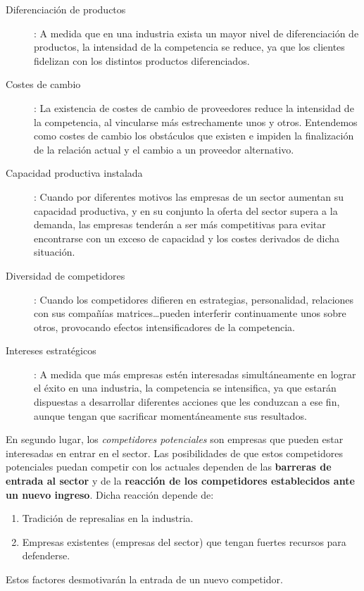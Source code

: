 \documentclass[10pt,a4paper,spanish]{report}
\begin{document}
\begin{description}
\begin{center}
                  \end{center}
                  \item[Diferenciación de productos]: A medida que en una industria exista un mayor nivel de diferenciación de productos, la intensidad de la competencia se reduce, ya que los clientes fidelizan con los distintos productos diferenciados.
                  \item[Costes de cambio]: La existencia de costes de cambio de proveedores reduce la intensidad de la competencia, al vincularse más estrechamente unos y otros. Entendemos como costes de cambio los obstáculos que existen e impiden la finalización de la relación actual y el cambio a un proveedor alternativo.
                  \item[Capacidad productiva instalada]: Cuando por diferentes motivos las empresas de un sector aumentan su capacidad productiva, y en su conjunto la oferta del sector supera a la demanda, las empresas tenderán a ser más competitivas para evitar encontrarse con un exceso de capacidad y los costes derivados de dicha situación.
                  \item[Diversidad de competidores]: Cuando los competidores difieren en estrategias, personalidad, relaciones con sus compañías matrices\ldots pueden interferir continuamente unos sobre otros, provocando efectos intensificadores de la competencia.
                  \item[Intereses estratégicos]: A medida que más empresas estén interesadas simultáneamente en lograr el éxito en una industria, la competencia se intensifica, ya que estarán dispuestas a desarrollar diferentes acciones que les conduzcan a ese fin, aunque tengan que sacrificar momentáneamente sus resultados.
            \end{description}

            En segundo lugar, los \textit{\textcolor[rgb]{0.3,0.4,0.6}{competidores potenciales}} son empresas que pueden estar interesadas en entrar en el sector. Las posibilidades de que estos competidores potenciales puedan competir con los actuales dependen de las \textbf{barreras de entrada al sector} y de la \textbf{reacción de los competidores establecidos ante un nuevo ingreso}. Dicha reacción depende de:
            \begin{enumerate}
                  \item Tradición de represalias en la industria.
                  \item Empresas existentes (empresas del sector) que tengan fuertes recursos para defenderse.
            \end{enumerate}
            Estos factores desmotivarán la entrada de un nuevo competidor.
\end{document}
